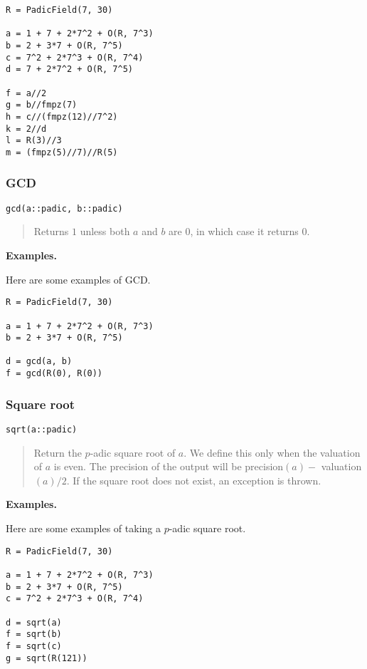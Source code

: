 \documentclass[a4paper,10pt]{article}
\newcommand{\desc}[1]{\vspace{-3mm}\begin{quote}#1\end{quote}}
\begin{document}
{{\begin{lstlisting}
R = PadicField(7, 30)

a = 1 + 7 + 2*7^2 + O(R, 7^3)
b = 2 + 3*7 + O(R, 7^5)
c = 7^2 + 2*7^3 + O(R, 7^4)
d = 7 + 2*7^2 + O(R, 7^5)

f = a//2
g = b//fmpz(7)
h = c//(fmpz(12)//7^2)
k = 2//d
l = R(3)//3
m = (fmpz(5)//7)//R(5)
\end{lstlisting}

\subsubsection{GCD}

\begin{lstlisting}
gcd(a::padic, b::padic)
\end{lstlisting}

\desc{Returns $1$ unless both $a$ and $b$ are $0$, in which case it returns $0$.}

\textbf{Examples.}

Here are some examples of GCD.

\begin{lstlisting}
R = PadicField(7, 30)

a = 1 + 7 + 2*7^2 + O(R, 7^3)
b = 2 + 3*7 + O(R, 7^5)

d = gcd(a, b)
f = gcd(R(0), R(0))
\end{lstlisting}

\subsubsection{Square root}

\begin{lstlisting}
sqrt(a::padic)
\end{lstlisting}

\desc{Return the $p$-adic square root of $a$. We define this only when the
valuation of $a$ is even. The precision of the output will be precision$(a) -$
valuation$(a)/2$. If the square root does not exist, an exception is thrown.}

\textbf{Examples.}

Here are some examples of taking a $p$-adic square root.

\begin{lstlisting}
R = PadicField(7, 30)

a = 1 + 7 + 2*7^2 + O(R, 7^3)
b = 2 + 3*7 + O(R, 7^5)
c = 7^2 + 2*7^3 + O(R, 7^4)

d = sqrt(a)
f = sqrt(b)
f = sqrt(c)
g = sqrt(R(121))
\end{lstlisting}

}}
\end{document}
